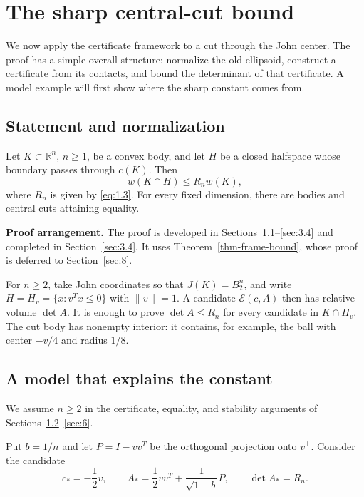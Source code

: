 \section{The sharp central-cut bound}\label{sec:3}

We now apply the certificate framework to a cut through the John center. The proof has a simple overall structure: normalize the old ellipsoid, construct a certificate from its contacts, and bound the determinant of that certificate. A model example will first show where the sharp constant comes from.

\subsection{Statement and normalization}\label{sec:3.1}

\begin{theorem}\label{thm-sharp}
Let $K\subset\mathbb R^n$, $n\ge1$, be a convex body, and let $H$ be a closed halfspace whose boundary passes through $c(K)$. Then
\begin{equation}\label{eq:3.1}
w(K\cap H)\le R_nw(K),
\end{equation}
where $R_n$ is given by \eqref{eq:1.3}. For every fixed dimension, there are bodies and central cuts attaining equality.

\end{theorem}

\textbf{Proof arrangement.} The proof is developed in Sections~\ref{sec:3.1}--\ref{sec:3.4} and
completed in Section~\ref{sec:3.4}. It uses Theorem~\ref{thm-frame-bound}, whose proof is deferred to
Section~\ref{sec:8}.

For $n\ge2$, take John coordinates so that $J(K)=B_2^n$, and write
$H=H_v=\{x:v^Tx\le0\}$ with $\|v\|=1$. A candidate $\mathcal E(c,A)$ then has relative volume $\det A$. It is enough to prove $\det A\le R_n$ for every candidate in $K\cap H_v$. The cut body has nonempty interior: it contains, for example, the ball with center $-v/4$ and radius $1/8$.

\subsection{A model that explains the constant}\label{sec:3.2}

We assume $n\ge2$ in the certificate, equality, and stability arguments of Sections~\ref{sec:3.2}--\ref{sec:6}.

Put $b=1/n$ and let $P=I-vv^T$ be the orthogonal projection onto $v^\perp$. Consider the candidate
\begin{equation}\label{eq:3.2}
c_*=-\frac12v,\qquad
A_*=\frac12vv^T+\frac1{\sqrt{1-b}}P,
\qquad \det A_*=R_n.
\end{equation}

